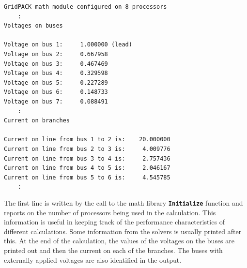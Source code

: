 {
\color{red}
\begin{Verbatim}[fontseries=b]
GridPACK math module configured on 8 processors
    :
Voltages on buses

Voltage on bus 1:     1.000000 (lead)
Voltage on bus 2:     0.667958
Voltage on bus 3:     0.467469
Voltage on bus 4:     0.329598
Voltage on bus 5:     0.227289
Voltage on bus 6:     0.148733
Voltage on bus 7:     0.088491
    :
Current on branches

Current on line from bus 1 to 2 is:    20.000000
Current on line from bus 2 to 3 is:     4.009776
Current on line from bus 3 to 4 is:     2.757436
Current on line from bus 4 to 5 is:     2.046167
Current on line from bus 5 to 6 is:     4.545785
    :
\end{Verbatim}
}

The first line is written by the call to the math library \texttt{\textbf{Initialize}} function and reports on the number of processors being used in the calculation. This information is useful in keeping track of the performance characteristics of different calculations. Some information from the solvers is usually printed after this. At the end of the calculation, the values of the voltages on the buses are printed out and then the current on each of the branches. The buses with externally applied voltages are also identified in the output.


